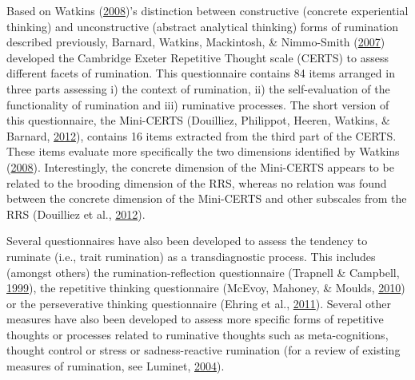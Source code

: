 \documentclass[a4paper,12pt,twoside,onecolumn,openright,final,oldfontcommands]{memoir}
\begin{document}
Based on Watkins (\protect\hyperlink{ref-Watkins2008}{2008})'s distinction between constructive (concrete experiential thinking) and unconstructive (abstract analytical thinking) forms of rumination described previously, Barnard, Watkins, Mackintosh, \& Nimmo-Smith (\protect\hyperlink{ref-barnard_getting_2007}{2007}) developed the Cambridge Exeter Repetitive Thought scale (CERTS) to assess different facets of rumination. This questionnaire contains 84 items arranged in three parts assessing i) the context of rumination, ii) the self-evaluation of the functionality of rumination and iii) ruminative processes. The short version of this questionnaire, the Mini-CERTS (Douilliez, Philippot, Heeren, Watkins, \& Barnard, \protect\hyperlink{ref-Douilliez2012}{2012}), contains 16 items extracted from the third part of the CERTS. These items evaluate more specifically the two dimensions identified by Watkins (\protect\hyperlink{ref-Watkins2008}{2008}). Interestingly, the concrete dimension of the Mini-CERTS appears to be related to the brooding dimension of the RRS, whereas no relation was found between the concrete dimension of the Mini-CERTS and other subscales from the RRS (Douilliez et al., \protect\hyperlink{ref-Douilliez2012}{2012}).

Several questionnaires have also been developed to assess the tendency to ruminate (i.e., trait rumination) as a transdiagnostic process. This includes (amongst others) the rumination-reflection questionnaire (Trapnell \& Campbell, \protect\hyperlink{ref-trapnell_private_1999}{1999}), the repetitive thinking questionnaire (McEvoy, Mahoney, \& Moulds, \protect\hyperlink{ref-McEvoy2010}{2010}) or the perseverative thinking questionnaire (Ehring et al., \protect\hyperlink{ref-Ehring2011}{2011}). Several other measures have also been developed to assess more specific forms of repetitive thoughts or processes related to ruminative thoughts such as meta-cognitions, thought control or stress or sadness-reactive rumination (for a review of existing measures of rumination, see Luminet, \protect\hyperlink{ref-luminet_assessment_2004}{2004}).
\end{document}
